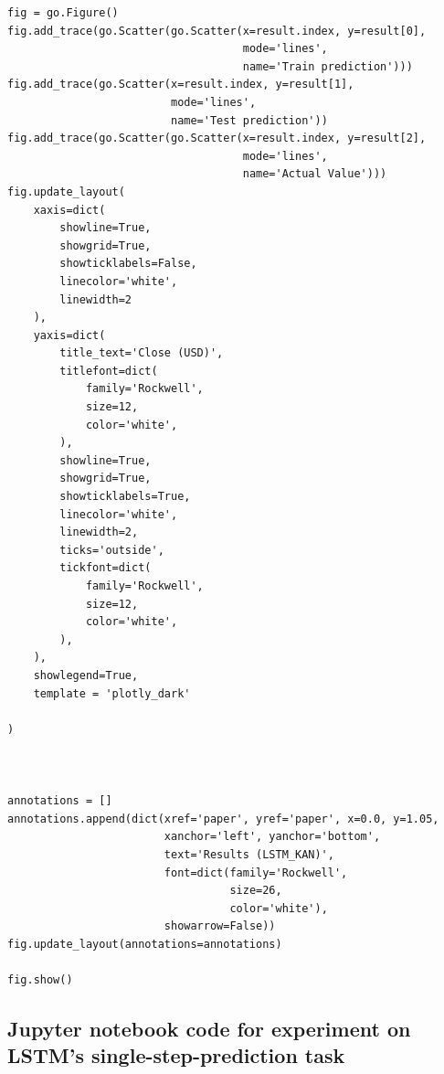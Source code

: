 \documentclass[stu,12pt,floatsintext]{apa7}
\begin{document}
\begin{verbatim}
fig = go.Figure()
fig.add_trace(go.Scatter(go.Scatter(x=result.index, y=result[0],
                                    mode='lines',
                                    name='Train prediction')))
fig.add_trace(go.Scatter(x=result.index, y=result[1],
                         mode='lines',
                         name='Test prediction'))
fig.add_trace(go.Scatter(go.Scatter(x=result.index, y=result[2],
                                    mode='lines',
                                    name='Actual Value')))
fig.update_layout(
    xaxis=dict(
        showline=True,
        showgrid=True,
        showticklabels=False,
        linecolor='white',
        linewidth=2
    ),
    yaxis=dict(
        title_text='Close (USD)',
        titlefont=dict(
            family='Rockwell',
            size=12,
            color='white',
        ),
        showline=True,
        showgrid=True,
        showticklabels=True,
        linecolor='white',
        linewidth=2,
        ticks='outside',
        tickfont=dict(
            family='Rockwell',
            size=12,
            color='white',
        ),
    ),
    showlegend=True,
    template = 'plotly_dark'

)



annotations = []
annotations.append(dict(xref='paper', yref='paper', x=0.0, y=1.05,
                        xanchor='left', yanchor='bottom',
                        text='Results (LSTM_KAN)',
                        font=dict(family='Rockwell',
                                  size=26,
                                  color='white'),
                        showarrow=False))
fig.update_layout(annotations=annotations)

fig.show()

\end{verbatim}

\subsection{Jupyter notebook code for experiment on LSTM's single-step-prediction task}
\end{document}
